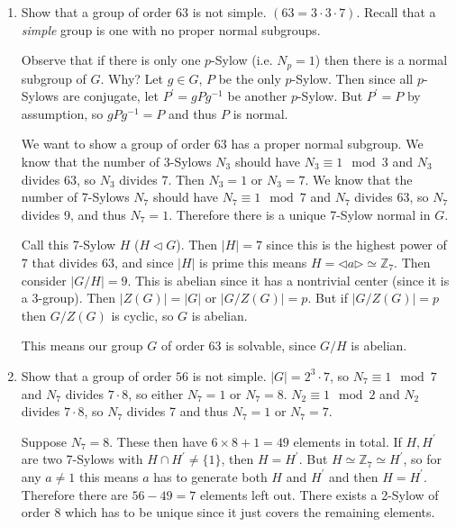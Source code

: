 \documentclass{article}
\begin{document}
\begin{xmpl}
\begin{enumerate}
  \item{
    Show that a group of order 63 is not simple.
    $(63 = 3 \cdot 3 \cdot 7)$. Recall that a \emph{simple} group is
    one with no proper normal subgroups.

    Observe that if there is only one $p$-Sylow (i.e. $N_p = 1$) then
    there is a normal subgroup of $G$. Why? Let $g \in G$, $P$ be
    the only $p$-Sylow. Then since all $p$-Sylows are conjugate, let
    $P^\prime = gPg^{-1}$ be another $p$-Sylow. But $P^\prime = P$ by
    assumption, so $gPg^{-1} = P$ and thus $P$ is normal.

    We want to show a group of order 63 has a proper normal subgroup.
    We know that the number of 3-Sylows $N_3$ should have
    $N_3 \equiv 1 \mod 3$ and $N_3$ divides 63, so $N_3$ divides
    7. Then $N_3 = 1$ or $N_3 = 7$. We know that the number of
    7-Sylows $N_7$ should have $N_7 \equiv 1 \mod 7$ and $N_7$ divides
    63, so $N_7$ divides 9, and thus $N_7 = 1$. Therefore there is a
    unique 7-Sylow normal in $G$.

    Call this 7-Sylow $H$ ($H \triangleleft G$). Then $|H| = 7$ since
    this is the highest power of $7$ that divides 63, and since $|H|$
    is prime this means
    $H = \triangleleft a \triangleright \simeq \mathbb{Z}_7$. Then
    consider $|G / H| = 9$. This is abelian since it has a nontrivial
    center (since it is a $3$-group).
    Then $|Z(G)| = |G|$ or $|G / Z(G)| = p$. But if $|G / Z(G)| = p$ then
    $G / Z(G)$ is cyclic, so $G$ is abelian.

    This means our group $G$ of order 63 is solvable, since $G / H$ is abelian.
  }
  \item{
    Show that a group of order $56$ is not simple.
    $|G| = 2^3 \cdot 7$, so $N_7 \equiv 1 \mod 7$ and $N_7$ divides $7
    \cdot 8$, so either $N_7 = 1$ or $N_7 = 8$. $N_2 \equiv 1 \mod 2$
    and $N_2$ divides $7 \cdot 8$, so $N_7$ divides 7 and thus $N_7 =
    1$ or $N_7 = 7$.

    Suppose $N_7 = 8$. These then have $6 \times 8 + 1 = 49$ elements
    in total. If $H, H^\prime$ are two 7-Sylows with $H \cap H^\prime
    \neq \{ 1 \}$, then $H = H^\prime$. But $H \simeq \mathbb{Z}_7
    \simeq H^\prime$, so for any $a \neq 1$ this means $a$ has to
    generate both $H$ and $H^\prime$ and then $H =
    H^\prime$. Therefore there are $56 - 49 = 7$ elements left
    out. There exists a 2-Sylow of order 8 which has to be unique
    since it just covers the remaining elements.

}
\end{enumerate}
\end{xmpl}
\end{document}
